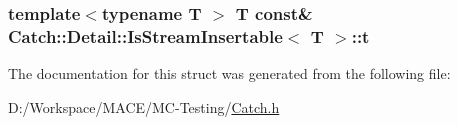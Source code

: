 \subsubsection[{\texorpdfstring{t}{t}}]{\setlength{\rightskip}{0pt plus 5cm}template$<$typename T $>$ T const\& {\bf Catch\+::\+Detail\+::\+Is\+Stream\+Insertable}$<$ T $>$\+::{\bf t}\hspace{0.3cm}{\ttfamily [static]}}\hypertarget{struct_catch_1_1_detail_1_1_is_stream_insertable_a7d2a3da978b6736667a7b2f6d51f507f}{}\label{struct_catch_1_1_detail_1_1_is_stream_insertable_a7d2a3da978b6736667a7b2f6d51f507f}


The documentation for this struct was generated from the following file\+:\begin{DoxyCompactItemize}
\item 
D\+:/\+Workspace/\+M\+A\+C\+E/\+M\+C-\/\+Testing/\hyperlink{_catch_8h}{Catch.\+h}\end{DoxyCompactItemize}
